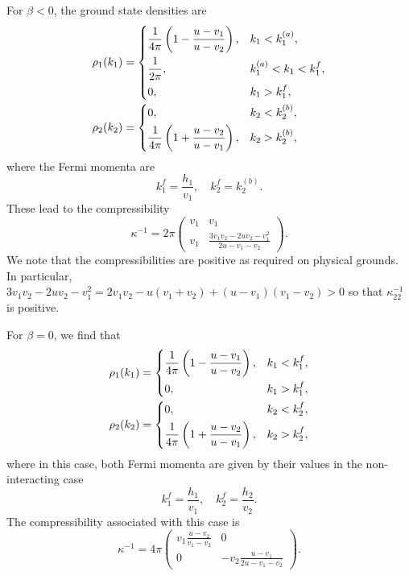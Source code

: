 \documentclass[aps,pra,
superscriptaddress,
reprint,twocolumn,preprintnumbers,
amsmath,amssymb,
nofootinbib]{revtex4-1}
\newcommand{\beq}{\begin{equation}}
\newcommand{\eeq}{\end{equation}}
\begin{document}
For $\beta<0$, the ground state densities are
        \begin{align}
        &\rho_1(k_1) = 
        \begin{dcases}
        \frac{1}{4\pi} \left(1 - \frac{u - v_1}{u - v_2} \right), &k_1<k_1^{(a)}, \\
        \frac{1}{2\pi}, &k_1^{(a)}<k_1<k_1^f,\\
        0, &k_1>k_1^f,
        \end{dcases}\nonumber \\
        &\rho_2(k_2) = 
        \begin{dcases}
        0, &k_2<k_2^{(b)},\\
        \frac{1}{4\pi} \left(1 + \frac{u - v_2}{u - v_1} \right), &k_2>k_2^{(b)},
        \end{dcases}
        \end{align}
where the Fermi momenta are
		\beq
		k_1^f = \frac{h_1}{v_1},\quad k_2^f = k_2^{(b)}.
		\eeq
These lead to the compressibility
        \begin{equation}
        \kappa^{-1} = 2 \pi \left(
        \begin{array}{cc}
        v_1 & v_1\\
        v_1 & \frac{3 v_1 v_2 - 2 u v_2 - v_1^2}{2u - v_1 - v_2}
        \end{array} \right). 
        \end{equation}
We note that the compressibilities are positive as required on physical grounds. In particular, $3 v_1 v_2 - 2 u v_2 - v_1^2 = 2 v_1 v_2 - u (v_1 + v_2) + (u - v_1)(v_1 - v_2)>0$ so that $\kappa_{22}^{-1}$ is positive.  
     
For $\beta = 0$, we find that 
        \begin{align}
        &\rho_1(k_1) = 
        \begin{dcases}
        \frac{1}{4\pi} \left(1 - \frac{u - v_1}{u - v_2} \right), &k_1<k_1^f, \\
        0, &k_1>k_1^f,
        \end{dcases}\nonumber\\
        &\rho_2(k_2) = 
        \begin{dcases}
        0, &k_2<k_2^f,\\
        \frac{1}{4\pi} \left(1 + \frac{u - v_2}{u - v_1} \right), &k_2>k_2^f,
        \end{dcases}
        \end{align}
where in this case, both Fermi momenta are given by their values in the non-interacting case        
        \beq
		k_1^f = \frac{h_1}{v_1},\quad k_2^f = \frac{h_2}{v_2}.
		\eeq
The compressibility associated with this case is
        \begin{equation}
        \kappa^{-1} = 4 \pi \left(
        \begin{array}{cc}
        v_1 \frac{u - v_2}{v_1 - v_2} & 0\\
        0 & - v_2 \frac{u - v_1}{2u - v_1 - v_2}
        \end{array} \right).
        \end{equation} 
        
\end{document}
